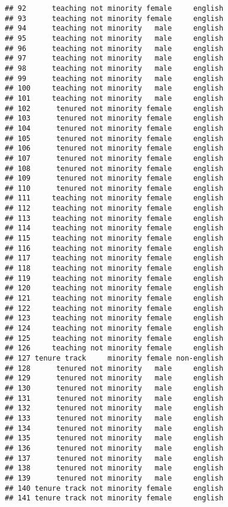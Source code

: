 \documentclass[
]{article}
\begin{document}
\begin{verbatim}
## 92      teaching not minority female     english
## 93      teaching not minority female     english
## 94      teaching not minority   male     english
## 95      teaching not minority   male     english
## 96      teaching not minority   male     english
## 97      teaching not minority   male     english
## 98      teaching not minority   male     english
## 99      teaching not minority   male     english
## 100     teaching not minority   male     english
## 101     teaching not minority   male     english
## 102      tenured not minority female     english
## 103      tenured not minority female     english
## 104      tenured not minority female     english
## 105      tenured not minority female     english
## 106      tenured not minority female     english
## 107      tenured not minority female     english
## 108      tenured not minority female     english
## 109      tenured not minority female     english
## 110      tenured not minority female     english
## 111     teaching not minority female     english
## 112     teaching not minority female     english
## 113     teaching not minority female     english
## 114     teaching not minority female     english
## 115     teaching not minority female     english
## 116     teaching not minority female     english
## 117     teaching not minority female     english
## 118     teaching not minority female     english
## 119     teaching not minority female     english
## 120     teaching not minority female     english
## 121     teaching not minority female     english
## 122     teaching not minority female     english
## 123     teaching not minority female     english
## 124     teaching not minority female     english
## 125     teaching not minority female     english
## 126     teaching not minority female     english
## 127 tenure track     minority female non-english
## 128      tenured not minority   male     english
## 129      tenured not minority   male     english
## 130      tenured not minority   male     english
## 131      tenured not minority   male     english
## 132      tenured not minority   male     english
## 133      tenured not minority   male     english
## 134      tenured not minority   male     english
## 135      tenured not minority   male     english
## 136      tenured not minority   male     english
## 137      tenured not minority   male     english
## 138      tenured not minority   male     english
## 139      tenured not minority   male     english
## 140 tenure track not minority female     english
## 141 tenure track not minority female     english

\end{verbatim}
\end{document}
